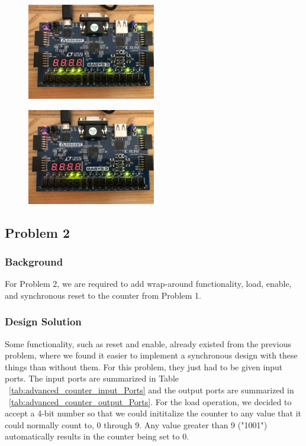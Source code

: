 \documentclass[11pt]{article}
\begin{document}
\begin{figure}[H]
\begin{center}
	\includegraphics[width=0.5\textwidth]{./images/Part1/l9p1img8.jpg}
	\caption{\label{fig:part1_img8}}
\end{center}
\end{figure}

\begin{figure}[H]
\begin{center}
	\includegraphics[width=0.5\textwidth]{./images/Part1/l9p1img9.jpg}
	\caption{\label{fig:part1_img9}}
\end{center}
\end{figure}


\subsection{Problem 2 }

\subsubsection{Background}
For Problem 2, we are required to add wrap-around functionality, load, enable, and synchronous reset to the counter from Problem 1.

\subsubsection{Design Solution}
Some functionality, such as reset and enable, already existed from the previous problem, where we found it easier to implement a synchronous design with these things than without them. For this problem, they just had to be given input ports. The input ports are summarized in Table ~\ref{tab:advanced_counter_input_Ports} and the output ports are summarized in ~\ref{tab:advanced_counter_output_Ports}. For the load operation, we decided to accept a 4-bit number so that we could inititalize the counter to any value that it could normally count to, 0 through 9. Any value greater than 9 ("1001") automatically results in the counter being set to 0.
\end{document}
